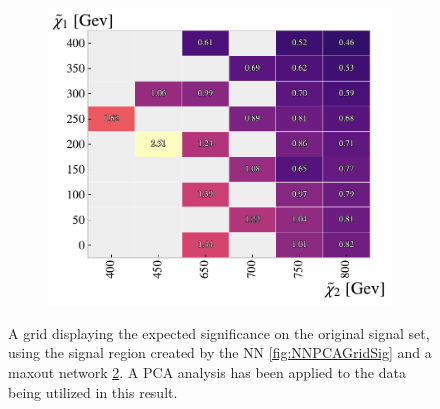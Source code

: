 \begin{figure}[H]
{\begin{subfigure}{.5\textwidth}
        \includegraphics[width=\textwidth]{Figures/MLResults/NN/SUSY/Grid/MaxOutPCAGridSig.pdf}
        \caption{}
        \label{fig:MaxOutPCAGridSig}
    \end{subfigure}
    }
    \caption{A grid displaying the expected significance on the original signal set, using the signal region 
    created by the \acs{NN} \ref{fig:NNPCAGridSig} and a maxout network \ref{fig:MaxOutPCAGridSig}. A \ac{PCA} 
    analysis has been applied to the data being utilized in this result.}
\end{figure}

